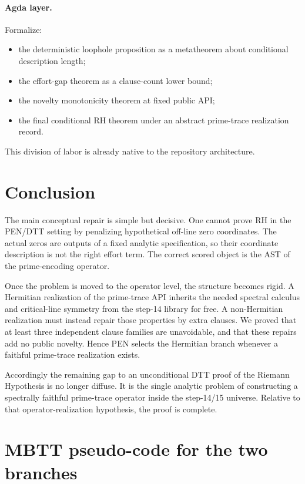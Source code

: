 \documentclass[11pt,a4paper]{article}
\theoremstyle{plain}
\theoremstyle{definition}
\theoremstyle{remark}
\begin{document}
\paragraph{Agda layer.}
Formalize:
\begin{itemize}[leftmargin=2em]
  \item the deterministic loophole proposition as a metatheorem about conditional description length;
  \item the effort-gap theorem as a clause-count lower bound;
  \item the novelty monotonicity theorem at fixed public API;
  \item the final conditional RH theorem under an abstract prime-trace realization record.
\end{itemize}

This division of labor is already native to the repository architecture.

\section{Conclusion}

The main conceptual repair is simple but decisive. One cannot prove RH in the PEN/DTT setting by penalizing hypothetical off-line zero coordinates. The actual zeros are outputs of a fixed analytic specification, so their coordinate description is not the right effort term. The correct scored object is the AST of the prime-encoding operator.

Once the problem is moved to the operator level, the structure becomes rigid. A Hermitian realization of the prime-trace API inherits the needed spectral calculus and critical-line symmetry from the step-14 library for free. A non-Hermitian realization must instead repair those properties by extra clauses. We proved that at least three independent clause families are unavoidable, and that these repairs add no public novelty. Hence PEN selects the Hermitian branch whenever a faithful prime-trace realization exists.

Accordingly the remaining gap to an unconditional DTT proof of the Riemann Hypothesis is no longer diffuse. It is the single analytic problem of constructing a spectrally faithful prime-trace operator inside the step-14/15 universe. Relative to that operator-realization hypothesis, the proof is complete.

\appendix

\section{MBTT pseudo-code for the two branches}
\end{document}
